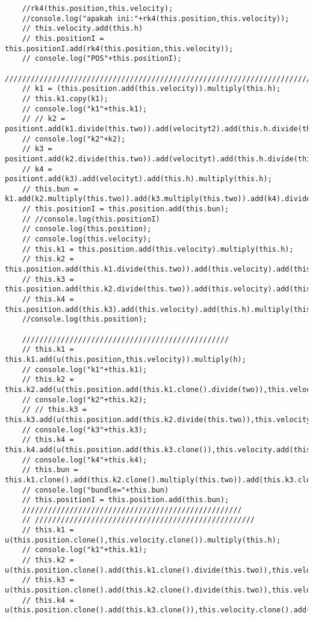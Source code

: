 \begin{lstlisting}
    //rk4(this.position,this.velocity);
    //console.log("apakah ini:"+rk4(this.position,this.velocity));
    // this.velocity.add(this.h)
    // this.positionI = this.positionI.add(rk4(this.position,this.velocity));
    // console.log("POS"+this.positionI);
    ///////////////////////////////////////////////////////////////////////////////////////////////////////////////////////
    // k1 = (this.position.add(this.velocity)).multiply(this.h);
    // this.k1.copy(k1);
    // console.log("k1"+this.k1);
    // // k2 = positiont.add(k1.divide(this.two)).add(velocityt2).add(this.h.divide(this.two)).multiply(this.h);
    // console.log("k2"+k2);
    // k3 = positiont.add(k2.divide(this.two)).add(velocityt).add(this.h.divide(this.two)).multiply(this.h);
    // k4 = positiont.add(k3).add(velocityt).add(this.h).multiply(this.h);
    // this.bun = k1.add(k2.multiply(this.two)).add(k3.multiply(this.two)).add(k4).divide(this.Six);
    // this.positionI = this.position.add(this.bun);
    // //console.log(this.positionI)
    // console.log(this.position);
    // console.log(this.velocity);
    // this.k1 = this.position.add(this.velocity).multiply(this.h);
    // this.k2 = this.position.add(this.k1.divide(this.two)).add(this.velocity).add(this.h.divide(this.two)).multiply(this.h);
    // this.k3 = this.position.add(this.k2.divide(this.two)).add(this.velocity).add(this.h.divide(this.two)).multiply(this.h);
    // this.k4 = this.position.add(this.k3).add(this.velocity).add(this.h).multiply(this.h);
    //console.log(this.position);

    ////////////////////////////////////////////////
    // this.k1 = this.k1.add(u(this.position,this.velocity)).multiply(h);
    // console.log("k1"+this.k1);
    // this.k2 = this.k2.add(u(this.position.add(this.k1.clone().divide(two)),this.velocity.add(h.divide(two)))).multiply(h);
    // console.log("k2"+this.k2);
    // // this.k3 = this.k3.add(u(this.position.add(this.k2.divide(this.two)),this.velocity.add(this.h.divide(this.two)))).multiply(this.h);
    // console.log("k3"+this.k3);
    // this.k4 = this.k4.add(u(this.position.add(this.k3.clone()),this.velocity.add(this.h))).multiply(this.h);
    // console.log("k4"+this.k4);
    // this.bun = this.k1.clone().add(this.k2.clone().multiply(this.two)).add(this.k3.clone().multiply(this.two)).add(this.k4.clone()).divide(this.Six);
    // console.log("bundle="+this.bun)
    // this.positionI = this.position.add(this.bun);
    ///////////////////////////////////////////////////
    // ///////////////////////////////////////////////////
    // this.k1 = u(this.position.clone(),this.velocity.clone()).multiply(this.h);
    // console.log("k1"+this.k1);
    // this.k2 = u(this.position.clone().add(this.k1.clone().divide(this.two)),this.velocity.clone().add(this.h.clone().divide(this.two))).multiply(this.h);
    // this.k3 = u(this.position.clone().add(this.k2.clone().divide(this.two)),this.velocity.clone().add(this.h.clone().divide(this.two))).multiply(this.h);
    // this.k4 = u(this.position.clone().add(this.k3.clone()),this.velocity.clone().add(this.h)).multiply(this.h);


\end{lstlisting}
